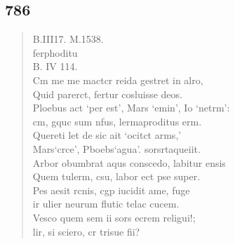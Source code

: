 \documentclass[11pt, a4paper]{report}
\begin{document}
            \subsection*{786}
      \begin{verse}
      B.III17. M.1538. \\ ferphoditu \\ B. IV 114. \\ Cm me me mactcr reida gestret in alro, \\ Quid parerct, fertur cosluisse deos. \\ Ploebus act ‘per est’, Mars ‘emin’, Io ‘netrm’: \\ cm, gquc sum nfus, lermaproditus erm. \\ Quereti let de sic ait ‘ocitct arms,’ \\ Mars‘crce’, Pboebs‘agua’. sorsrtaqueiit. \\ Arbor obumbrat aqus conscedo, labitur ensis \\ Quem tulerm, csu, labor ect pse super. \\ Pes aesit rcnis, cgp iucidit ame, fuge \\ ir ulier neurum flutic telac cucem. \\ Vesco quem sem ii sors ecrem religui!; \\ lir, si sciero, cr trisue fii? \\ 
      \end{verse}
  
\end{document}
